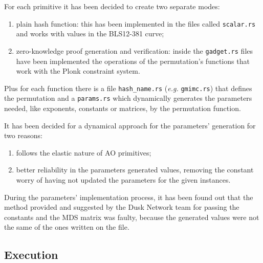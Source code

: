 \documentclass[12pt, a4paper]{report}
\begin{document}
For each primitive it has been decided to create two separate modes:
\begin{enumerate}
  \item plain hash function: this has been implemented in the files called \texttt{scalar.rs} and works with values in the BLS12-381 curve;
  \item zero-knowledge proof generation and verification: inside the \texttt{gadget.rs} files have been implemented the operations of the permutation's functions that work with the \textsf{Plonk} constraint system.
\end{enumerate}
Plus for each function there is a file \texttt{hash\_name.rs} (\textsl{e.g.} \texttt{gmimc.rs}) that defines the permutation and a \texttt{params.rs} which dynamically generates the parameters needed, like exponents, constants or matrices, by the permutation function.

It has been decided for a dynamical approach for the parameters' generation for two reasons:
\begin{enumerate}
  \item follows the elastic nature of AO primitives;
  \item better reliability in the parameters generated values, removing the constant worry of having not updated the parameters for the given instances.
\end{enumerate}

\begin{note}
  During the parameters' implementation process, it has been found out that the method provided and suggested by the Dusk Network team for passing the constants and the MDS matrix was faulty, because the generated values were not the same of the ones written on the file.
\end{note}

\subsection{Execution}\label{subsec:execution}
\end{document}
